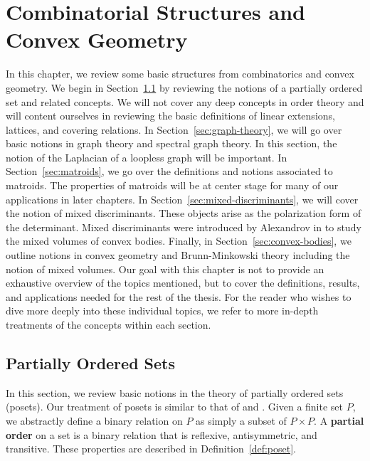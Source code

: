 \documentclass{puthesis-UG}
\begin{document}
\chapter{Combinatorial Structures and Convex Geometry}

In this chapter, we review some basic structures from combinatorics and convex geometry. We begin in Section~\ref{sec:posets} by reviewing the notions of a partially ordered set and related concepts. We will not cover any deep concepts in order theory and will content ourselves in reviewing the basic definitions of linear extensions, lattices, and covering relations. In Section~\ref{sec:graph-theory}, we will go over basic notions in graph theory and spectral graph theory. In this section, the notion of the Laplacian of a loopless graph will be important. In Section~\ref{sec:matroids}, we go over the definitions and notions associated to matroids. The properties of matroids will be at center stage for many of our applications in later chapters. In Section~\ref{sec:mixed-discriminants}, we will cover the notion of mixed discriminants. These objects arise as the polarization form of the determinant. Mixed discriminants were introduced by Alexandrov in \cite{aleksandrov} to study the mixed volumes of convex bodies. Finally, in Section~\ref{sec:convex-bodies}, we outline notions in convex geometry and Brunn-Minkowski theory including the notion of mixed volumes. Our goal with this chapter is not to provide an exhaustive overview of the topics mentioned, but to cover the definitions, results, and applications needed for the rest of the thesis. For the reader who wishes to dive more deeply into these individual topics, we refer to more in-depth treatments of the concepts within each section. 

\section{Partially Ordered Sets} \label{sec:posets}

In this section, we review basic notions in the theory of partially ordered sets (posets). Our treatment of posets is similar to that of \cite{ordered-sets} and \cite{Rota1964}. Given a finite set $P$, we abstractly define a binary relation on $P$ as simply a subset of $P \times P$. A \textbf{partial order} on a set is a binary relation that is reflexive, antisymmetric, and transitive. These properties are described in Definition~\ref{def:poset}. 
\end{document}
